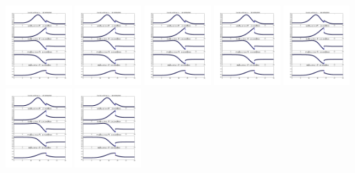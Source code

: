 \documentclass[11pt]{article}
\begin{document}
\vskip 10pt 
\includegraphics[width=0.19\textwidth]{frame0132fig1.png}
\vskip 10pt 
\includegraphics[width=0.19\textwidth]{frame0133fig1.png}
\vskip 10pt 
\includegraphics[width=0.19\textwidth]{frame0134fig1.png}
\vskip 10pt 
\includegraphics[width=0.19\textwidth]{frame0135fig1.png}
\vskip 10pt 
\includegraphics[width=0.19\textwidth]{frame0136fig1.png}
\vskip 10pt 
\includegraphics[width=0.19\textwidth]{frame0137fig1.png}
\vskip 10pt 
\includegraphics[width=0.19\textwidth]{frame0138fig1.png}
\end{document}
